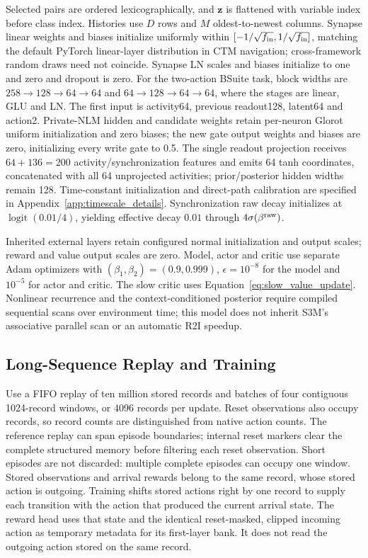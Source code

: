 \documentclass{article}
\begin{document}
Selected pairs are ordered lexicographically, and $\mathbf z$ is flattened with variable index before class index. Histories use $D$ rows and $M$ oldest-to-newest columns. Synapse linear weights and biases initialize uniformly within $[-1/\sqrt{f_{\rm in}},1/\sqrt{f_{\rm in}}]$, matching the default PyTorch linear-layer distribution in CTM navigation; cross-framework random draws need not coincide. Synapse LN scales and biases initialize to one and zero and dropout is zero. For the two-action BSuite task, block widths are $258\to128\to64\to64$ and $64\to128\to64\to64$, where the stages are linear, GLU and LN. The first input is activity64, previous readout128, latent64 and action2. Private-NLM hidden and candidate weights retain per-neuron Glorot uniform initialization and zero biases; the new gate output weights and biases are zero, initializing every write gate to 0.5. The single readout projection receives $64+136=200$ activity/synchronization features and emits 64 tanh coordinates, concatenated with all 64 unprojected activities; prior/posterior hidden widths remain 128. Time-constant initialization and direct-path calibration are specified in Appendix~\ref{app:timescale_details}. Synchronization raw decay initializes at $\operatorname{logit}(0.01/4)$, yielding effective decay $0.01$ through $4\sigma(\beta^{\rm raw})$.

Inherited external layers retain configured normal initialization and output scales; reward and value output scales are zero. Model, actor and critic use separate Adam optimizers with $(\beta_1,\beta_2)=(0.9,0.999)$, $\epsilon=10^{-8}$ for the model and $10^{-5}$ for actor and critic. The slow critic uses Equation~\eqref{eq:slow_value_update}. Nonlinear recurrence and the context-conditioned posterior require compiled sequential scans over environment time; this model does not inherit S3M's associative parallel scan or an automatic R2I speedup.

\subsection{Long-Sequence Replay and Training}

Use a FIFO replay of ten million stored records and batches of four contiguous 1024-record windows, or 4096 records per update. Reset observations also occupy records, so record counts are distinguished from native action counts. The reference replay can span episode boundaries; internal reset markers clear the complete structured memory before filtering each reset observation. Short episodes are not discarded: multiple complete episodes can occupy one window. Stored observations and arrival rewards belong to the same record, whose stored action is outgoing. Training shifts stored actions right by one record to supply each transition with the action that produced the current arrival state. The reward head uses that state and the identical reset-masked, clipped incoming action as temporary metadata for its first-layer bank. It does not read the outgoing action stored on the same record.
\end{document}
